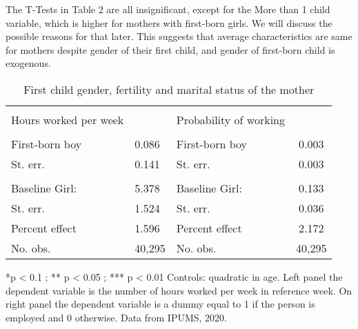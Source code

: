\documentclass[12pt,draft,a4paper]{article}
\begin{document}
The T-Tests in Table 2 are all insignificant, except for the More than 1 child variable, which is higher for mothers with first-born girls.
We will discuss the possible reasons for that later.
This suggests that average characteristics are same for mothers despite gender of their first child, and gender of first-born child is exogenous.

\begin{table}[tbp]%
    \caption{First child gender, fertility and marital status of the mother}

    
    \begin{tabularx}{\textwidth}{lXlc}
    
    \hline & \\[-1.0em]
    Hours worked per week & & Probability of working &  \\
    \hline & \\[-1.0em]
        First-born boy          & 0.086           & First-born boy           & 0.003           \\
        St. err.                & 0.141           & St. err.                 & 0.003           \\
        \\[-1.0em]
        Baseline Girl:          & 5.378           & Baseline Girl:           & 0.133           \\
        St. err.                & 1.524           & St. err.                 & 0.036           \\
        Percent effect          & 1.596           & Percent effect           & 2.172           \\
        No. obs.                & 40,295          & No. obs.                 & 40,295          \\
    \hline
    \end{tabularx}

    *p < 0.1 ; ** p < 0.05 ; *** p < 0.01 Controls: quadratic in age. Left panel the dependent variable is the number of hours worked per week in reference week. 
    On right panel the dependent variable is a dummy equal to 1 if the person is employed and 0 otherwise. Data from IPUMS, 2020. 
    \label{tab:work}
    \end{table}
\end{document}
